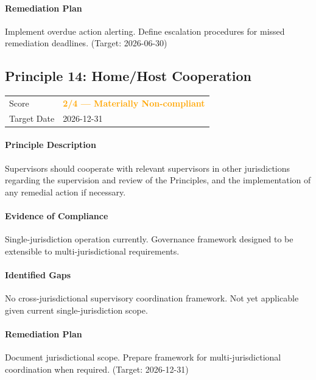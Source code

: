 \documentclass[11pt]{article}
\begin{document}
\paragraph{Remediation Plan}
Implement overdue action alerting. Define escalation procedures for missed remediation deadlines. (Target: 2026-06-30)

\subsection{Principle 14: Home/Host Cooperation}

\begin{table}[H]
    \centering
    \begin{tabular}{ll}
        \toprule
        Score & \textcolor{orange}{\textbf{2/4 --- Materially Non-compliant}} \\
        Target Date & 2026-12-31 \\
        \bottomrule
    \end{tabular}
\end{table}

\paragraph{Principle Description}
Supervisors should cooperate with relevant supervisors in other jurisdictions regarding the supervision and review of the Principles, and the implementation of any remedial action if necessary.

\paragraph{Evidence of Compliance}
Single-jurisdiction operation currently. Governance framework designed to be extensible to multi-jurisdictional requirements.

\paragraph{Identified Gaps}
No cross-jurisdictional supervisory coordination framework. Not yet applicable given current single-jurisdiction scope.

\paragraph{Remediation Plan}
Document jurisdictional scope. Prepare framework for multi-jurisdictional coordination when required. (Target: 2026-12-31)
\end{document}
